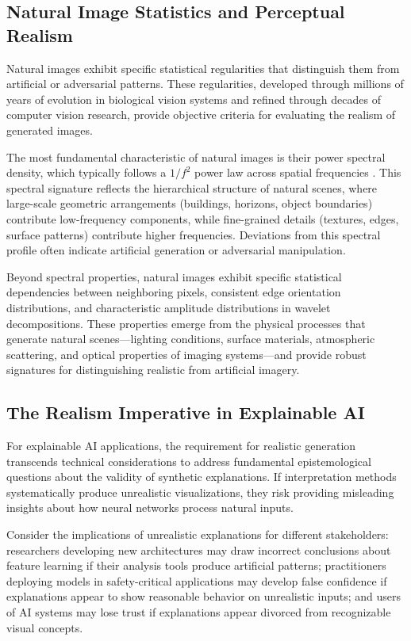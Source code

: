 \documentclass[licencjacka,en]{pracamgr}
\begin{document}
\subsection{Natural Image Statistics and Perceptual Realism}

Natural images exhibit specific statistical regularities that distinguish them from artificial or adversarial patterns. These regularities, developed through millions of years of evolution in biological vision systems and refined through decades of computer vision research, provide objective criteria for evaluating the realism of generated images.

The most fundamental characteristic of natural images is their power spectral density, which typically follows a $1/f^2$ power law across spatial frequencies \citep{field1987relations}. This spectral signature reflects the hierarchical structure of natural scenes, where large-scale geometric arrangements (buildings, horizons, object boundaries) contribute low-frequency components, while fine-grained details (textures, edges, surface patterns) contribute higher frequencies. Deviations from this spectral profile often indicate artificial generation or adversarial manipulation.

Beyond spectral properties, natural images exhibit specific statistical dependencies between neighboring pixels, consistent edge orientation distributions, and characteristic amplitude distributions in wavelet decompositions. These properties emerge from the physical processes that generate natural scenes—lighting conditions, surface materials, atmospheric scattering, and optical properties of imaging systems—and provide robust signatures for distinguishing realistic from artificial imagery.

\subsection{The Realism Imperative in Explainable AI}

For explainable AI applications, the requirement for realistic generation transcends technical considerations to address fundamental epistemological questions about the validity of synthetic explanations. If interpretation methods systematically produce unrealistic visualizations, they risk providing misleading insights about how neural networks process natural inputs.

Consider the implications of unrealistic explanations for different stakeholders: researchers developing new architectures may draw incorrect conclusions about feature learning if their analysis tools produce artificial patterns; practitioners deploying models in safety-critical applications may develop false confidence if explanations appear to show reasonable behavior on unrealistic inputs; and users of AI systems may lose trust if explanations appear divorced from recognizable visual concepts.
\end{document}
